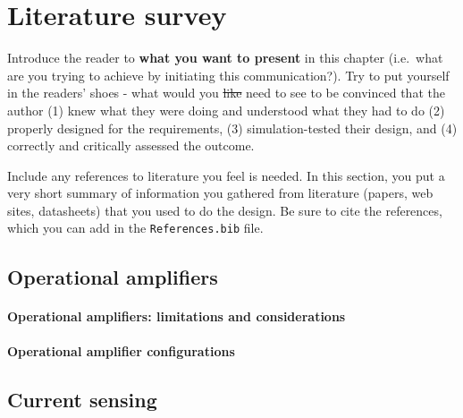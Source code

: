 
\chapter{Literature survey}\label{chap:Lit}

Introduce the reader to \textbf{what you want to present} in this chapter (i.e.\ what are you trying to achieve by initiating this communication?).
Try to put yourself in the readers' shoes - what would you \sout{like} need to see to be convinced that the author (1) knew what they were doing and understood what they had to do (2) properly designed for the requirements, (3) simulation-tested their design, and (4) correctly and critically assessed the outcome. 

Include any references to literature you feel is needed. 
In this section, you put a very short summary of information you gathered from literature (papers, web sites, datasheets) that you used to do the design. Be sure to cite the references, which you can add in the \texttt{References.bib} file. 

\section{Operational amplifiers}\label{sec:opamps}

\subsubsection{Operational amplifiers: limitations and considerations}\label{sec:opamps_limits}

\subsubsection{Operational amplifier configurations}\label{sec:opamps_configs}


\section{Current sensing}\label{sec:cursens}
















